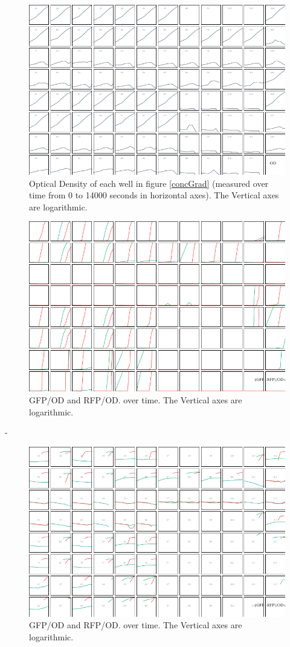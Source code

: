 \documentclass[11pt]{book}
\begin{document}
\pagebreak

\begin{figure}[h]
\includegraphics[scale=1.7, angle=-90, origin=c]{OD-LogPlot.pdf}
\caption{
Optical Density of each well in figure \ref{concGrad} (measured over time from 0 to 14000 seconds in horizontal axes). The Vertical axes are logarithmic.}
\label{ODLogPlot}
\end{figure}


\begin{figure}[h]
\includegraphics[scale=1.7, angle=-90, origin=c]{GfpPlusRfpByODCorrectedYMax80000.pdf}
\caption{
GFP/OD and RFP/OD. over time. The Vertical axes are logarithmic.}
\label{fig:GfpRfpByOD}
\end{figure}

-

\pagebreak

\begin{figure}[h]
\includegraphics[scale=1.7, angle=-90, origin=c]{LogGfpPlusRfpByODCorrectedYMax12.pdf}
\caption{
GFP/OD and RFP/OD. over time. The Vertical axes are logarithmic.}
\label{fig:GfpRfpByODLog}
\end{figure}
\end{document}
